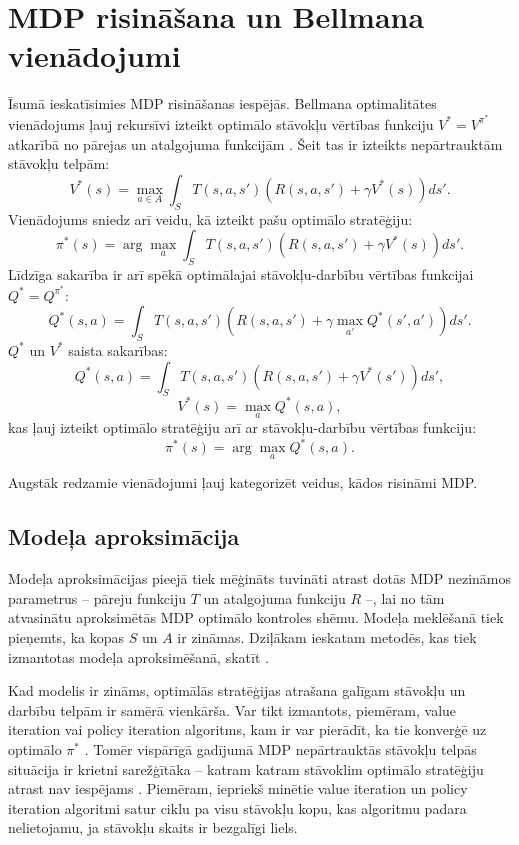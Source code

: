 \documentclass{ludis} %
\begin{document}
\section{MDP risināšana un Bellmana vienādojumi}
Īsumā ieskatīsimies MDP risināšanas iespējās.
Bellmana optimalitātes vienādojums ļauj rekursīvi izteikt optimālo stāvokļu vērtības funkciju $V^* = V^{\pi^*}$ atkarībā no pārejas un atalgojuma funkcijām \autocite{Bel}\autocite{Otterlo}\autocite{Hasselt2012}.
Šeit tas ir izteikts nepārtrauktām stāvokļu telpām: 
\[
	V^*(s) = \max_{a\in A} \int_S T(s,a,s')\left(R(s,a,s') + \gamma V^*(s)\right) ds'.
\]
Vienādojums sniedz arī veidu, kā izteikt pašu optimālo stratēģiju:
\begin{equation}
	\pi^*(s) =  \arg \max_{a} \int_S T(s,a,s')\left(R(s,a,s') + \gamma V^*(s)\right) ds'. \label{eq:1}
\end{equation}
Līdzīga sakarība ir arī spēkā optimālajai stāvokļu-darbību vērtības funkcijai $Q^* = Q^{\pi^*}$:
\[
	Q^*(s, a) = \int_S T(s,a,s')\left(R(s,a,s') + \gamma \max_{a'}Q^*(s',a')\right) ds'.
\]
$Q^*$ un $V^*$ saista sakarības:
\[
	Q^*(s, a) = \int_S T(s,a,s')\left(R(s,a,s') + \gamma V^*(s')\right) ds',
\]
\[
	V^*(s) = \max_{a} Q^*(s,a),
\]
kas ļauj izteikt optimālo stratēģiju arī ar stāvokļu-darbību vērtības funkciju:
\begin{equation}
	\pi^*(s) = \arg \max_a Q^*(s, a). \label{eq:2}
\end{equation}

Augstāk redzamie vienādojumi ļauj kategorizēt veidus, kādos risināmi MDP.

\subsection{Modeļa aproksimācija}
Modeļa aproksimācijas pieejā tiek mēģināts tuvināti atrast dotās MDP nezināmos parametrus -- pāreju funkciju $T$ un atalgojuma funkciju $R$ --, lai no tām atvasinātu aproksimētās MDP optimālo kontroles shēmu.
Modeļa meklēšanā tiek pieņemts, ka kopas $S$ un $A$ ir zināmas.
Dziļākam ieskatam metodēs, kas tiek izmantotas modeļa aproksimēšanā, skatīt \autocite{nguyen2011model}.

Kad modelis ir zināms, optimālās stratēģijas atrašana galīgam stāvokļu un darbību telpām ir samērā vienkārša. Var tikt izmantots, piemēram, value iteration vai policy iteration algoritms, kam ir var pierādīt, ka tie konverģē uz optimālo $\pi^*$ \autocite{Barto}.
Tomēr vispārīgā gadījumā MDP nepārtrauktās stāvokļu telpās situācija ir krietni sarežģītāka -- katram katram stāvoklim optimālo stratēģiju atrast nav iespējams \autocite{Otterlo}.
Piemēram, iepriekš minētie value iteration un policy iteration algoritmi satur ciklu pa visu stāvokļu kopu, kas algoritmu padara nelietojamu, ja stāvokļu skaits ir bezgalīgi liels.
\end{document}
